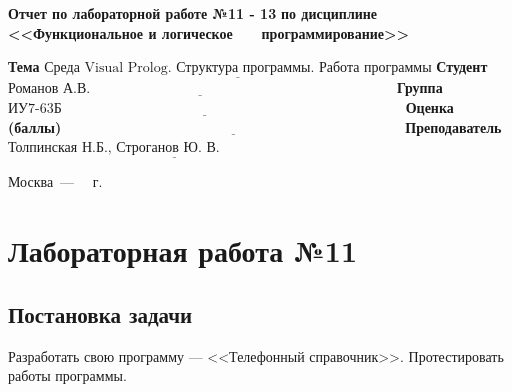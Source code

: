 \documentclass[12pt]{report}
\begin{document}
\begin{titlepage}
		\begin{center}
			\noindent\begin{minipage}{1.1\textwidth}\centering
				\Large\textbf{  Отчет по лабораторной работе №11 - 13}\newline
				\textbf{по дисциплине <<Функциональное и логическое}\newline
				\textbf{~~~программирование>>}\newline\newline
			\end{minipage}
		\end{center}
		
		\noindent\textbf{Тема} $\underline{\text{Среда Visual Prolog. Структура программы. Работа программы}}$\newline\newline
		\noindent\textbf{Студент} $\underline{\text{Романов А.В.~~~~~~~~~~~~~~~~~~~~~~~~~~~~~~~~~~~~~~~~~~~~~~~~~~~~~~~~~~~~~~~~~}}$\newline\newline
		\noindent\textbf{Группа} $\underline{\text{ИУ7-63Б~~~~~~~~~~~~~~~~~~~~~~~~~~~~~~~~~~~~~~~~~~~~~~~~~~~~~~~~~~~~~~~~~~~~~~~~~}}$\newline\newline
		\noindent\textbf{Оценка (баллы)} $\underline{\text{~~~~~~~~~~~~~~~~~~~~~~~~~~~~~~~~~~~~~~~~~~~~~~~~~~~~~~~~~~~~~~~~~~~~~~~~}}$\newline\newline
		\noindent\textbf{Преподаватель} $\underline{\text{Толпинская Н.Б., Строганов Ю. В.~~~~~~~~~~~~~~~~~~~~~~~~~~}}$\newline\newline\newline
		
		\begin{center}
			\vfill
			Москва~---~\the\year
			~г.
		\end{center}
	\end{titlepage}
	

\chapter*{Лабораторная работа №11}
\section*{Постановка задачи}
Разработать свою программу — <<Телефонный справочник>>. Протестировать работы программы.
\end{document}
